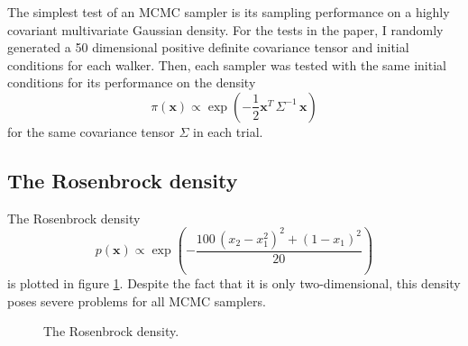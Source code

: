 \documentclass[12pt,preprint]{aastex}
\newcommand{\fig}[1]{figure \ref{fig:#1}}
\newcommand{\figlabel}[1]{\label{fig:#1}}
\begin{document}
The simplest test of an MCMC sampler is its sampling performance on a highly covariant
multivariate Gaussian density. For the tests in the paper, I randomly generated
a 50 dimensional positive definite covariance tensor and initial conditions for each
walker.  Then, each sampler was tested with the same initial conditions for its
performance on the density
\begin{equation}
    \pi (\mathbf{x}) \propto \exp\left ( -\frac{1}{2} \mathbf{x}^T \, \Sigma^{-1} \, \mathbf{x} \right )
\end{equation}
for the same covariance tensor $\Sigma$ in each trial.

\subsection{The Rosenbrock density}

The Rosenbrock density
\begin{equation}
    p(\mathbf{x}) \propto \exp \left ( -\frac{100 \, (x_2 - x_1^2)^2+ (1-x_1)^2}{20} \right )
\end{equation}
is plotted in \fig{rosenbrock}. Despite the fact that it is only two-dimensional,
this density poses severe problems for all MCMC samplers.


\begin{figure}
\caption{The Rosenbrock density.\figlabel{rosenbrock}}
\end{figure}
\end{document}
